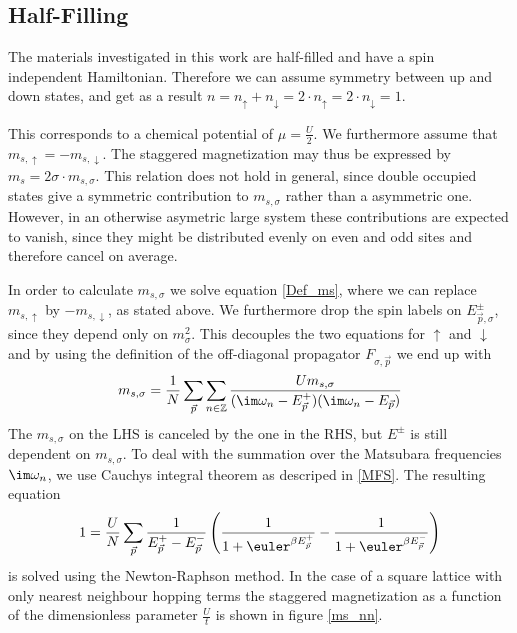 \documentclass[a4paper,10pt]{report}
\begin{document}
\subsection{Half-Filling}

The materials investigated in this work are half-filled and have a spin independent Hamiltonian.
Therefore we can assume symmetry between up and down states, and get as a result
$n=n_{\uparrow}+n_{\downarrow}=2\cdot n_{\uparrow}= 2\cdot n_{\downarrow} = 1$.

This corresponds to a chemical potential of 
$\mu=\frac{U}2$.
We furthermore assume that $m_{s,\uparrow}=-m_{s,\downarrow}$. 
The staggered magnetization may thus be expressed by $m_s=2\sigma \cdot m_{s,\sigma}$.
This relation does not hold in general, since double occupied states give a symmetric contribution to $m_{s,\sigma}$ rather than a asymmetric one.
However, in an otherwise asymetric large system these contributions are expected to vanish, since they might be distributed evenly on even and odd sites 
and therefore cancel on average.

In order to calculate $m_ {s,\sigma}$ we solve equation \ref{Def_ms}, where we can replace $m_{s,\uparrow}$ by $-m_{s,\downarrow}$, as stated above.
We furthermore drop the spin labels on $E_{\vec p,\sigma}^{\pm}$, since they depend only on $m_{\sigma}^2$.  
This decouples the two equations for $\uparrow$ and $\downarrow$ and by using the definition of the off-diagonal propagator $F_{\sigma,\vec{p}}$ we end up with
\begin{equation}
 m_{s,\sigma} = \frac1N \sum_{\vec{p}} \sum_{n\in \mathbb{Z}} 
							      \frac { Um_{s,\sigma} }
								    { (\im \omega_n - E_{\vec{p}}^+) (\im \omega_n - E_{\vec{p}})}
\end{equation}
The $m_{s,\sigma}$ on the LHS is canceled by the one in the RHS, but $E^{\pm}$ is still dependent on $m_{s,\sigma}$.
To deal with the summation over the Matsubara frequencies $\im \omega_n$, we use Cauchys integral theorem as descriped in \ref{MFS}.
The resulting equation
\begin{equation}
 1= \frac{U}{N}\sum_{\vec{p}} \frac{1}{E_{\vec p}^+ - E_{\vec{p}}^-} \left( \frac{1}{1+\euler^{\beta E_{\vec p}^+}} - \frac{1}{1+\euler^{\beta E_{\vec p}^-}} \right)
\end{equation}
is solved using the Newton-Raphson method.
In the case of a square lattice with only nearest neighbour hopping terms the staggered magnetization as a function of the dimensionless parameter $\frac{U}{t}$ is shown in figure
\ref{ms_nn}.
\end{document}

